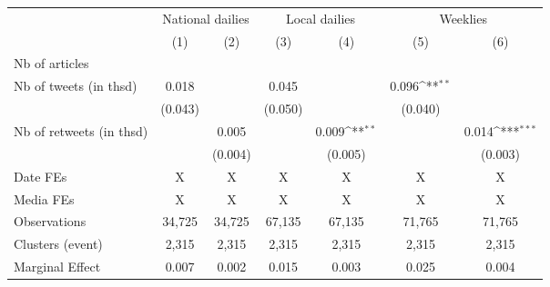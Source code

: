 {
\def\sym#1{\ifmmode^{#1}\else\(^{#1}\)\fi}
\begin{tabular}{l*{6}{c}}
\hline\hline
                    &\multicolumn{2}{c}{National dailies}       &\multicolumn{2}{c}{Local dailies}          &\multicolumn{2}{c}{Weeklies}               \\\cmidrule(lr){2-3}\cmidrule(lr){4-5}\cmidrule(lr){6-7}
                    &\multicolumn{1}{c}{(1)}         &\multicolumn{1}{c}{(2)}         &\multicolumn{1}{c}{(3)}         &\multicolumn{1}{c}{(4)}         &\multicolumn{1}{c}{(5)}         &\multicolumn{1}{c}{(6)}         \\
\hline
Nb of articles      &                     &                     &                     &                     &                     &                     \\
Nb of tweets (in thsd)&       0.018         &                     &       0.045         &                     &       0.096\sym{**} &                     \\
                    &     (0.043)         &                     &     (0.050)         &                     &     (0.040)         &                     \\
Nb of retweets (in thsd)&                     &       0.005         &                     &       0.009\sym{**} &                     &       0.014\sym{***}\\
                    &                     &     (0.004)         &                     &     (0.005)         &                     &     (0.003)         \\
\hline
Date FEs            &           X         &           X         &           X         &           X         &           X         &           X         \\
Media FEs           &           X         &           X         &           X         &           X         &           X         &           X         \\
Observations        &      34,725         &      34,725         &      67,135         &      67,135         &      71,765         &      71,765         \\
Clusters (event)    &       2,315         &       2,315         &       2,315         &       2,315         &       2,315         &       2,315         \\
Marginal Effect     &       0.007         &       0.002         &       0.015         &       0.003         &       0.025         &       0.004         \\
\hline\hline
\end{tabular}
}
